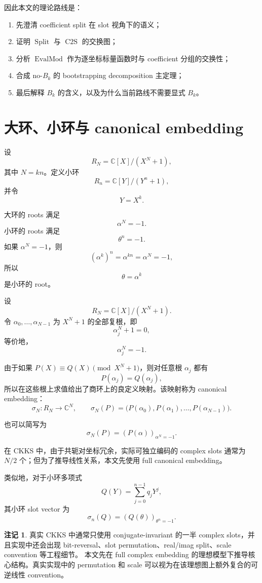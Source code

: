 \documentclass[UTF8,11pt]{ctexart}
\theoremstyle{definition}
\newtheorem{remark}{注记}
\newcommand{\C}{\mathbb{C}}
\newcommand{\CtwoS}{\operatorname{C2S}}
\newcommand{\Split}{\operatorname{Split}}
\newcommand{\EvalMod}{\operatorname{EvalMod}}
\begin{document}
因此本文的理论路线是：
\begin{enumerate}[label=(\roman*)]
    \item 先澄清 coefficient split 在 slot 视角下的语义；
    \item 证明 \(\Split\) 与 \(\CtwoS\) 的交换图；
    \item 分析 \(\EvalMod\) 作为逐坐标标量函数时与 coefficient 分组的交换性；
    \item 合成 no-\(B_k\) 的 bootstrapping decomposition 主定理；
    \item 最后解释 \(B_k\) 的含义，以及为什么当前路线不需要显式 \(B_k\)。
\end{enumerate}

\section{大环、小环与 canonical embedding}

设
\[
R_N=\C[X]/(X^N+1),
\]
其中 \(N=kn\)。定义小环
\[
R_n=\C[Y]/(Y^n+1),
\]
并令
\[
Y=X^k.
\]

大环的 roots 满足
\[
\alpha^N=-1.
\]
小环的 roots 满足
\[
\theta^n=-1.
\]
如果 \(\alpha^N=-1\)，则
\[
(\alpha^k)^n=\alpha^{kn}=\alpha^N=-1,
\]
所以
\[
\theta=\alpha^k
\]
是小环的 root。

设
\[
R_N=\mathbb{C}[X]/(X^N+1).
\]
令 \(\alpha_0,\ldots,\alpha_{N-1}\) 为 \(X^N+1\) 的全部复根，即
\[
\alpha_j^N+1=0,
\]
等价地，
\[
\alpha_j^N=-1.
\]

由于如果 \(P(X)\equiv Q(X)\pmod{X^N+1}\)，则对任意根 \(\alpha_j\) 都有
\[
P(\alpha_j)=Q(\alpha_j),
\]
所以在这些根上求值给出了商环上的良定义映射。该映射称为 canonical embedding：
\[
\sigma_N:R_N\to \mathbb{C}^N,
\qquad
\sigma_N(P)
=
\bigl(P(\alpha_0),P(\alpha_1),\ldots,P(\alpha_{N-1})\bigr).
\]

也可以简写为
\[
\sigma_N(P)=\left(P(\alpha)\right)_{\alpha^N=-1}.
\]

在 CKKS 中，由于共轭对坐标冗余，实际可独立编码的 complex slots 通常为 \(N/2\) 个；但为了推导线性关系，本文先使用 full canonical embedding。

类似地，对于小环多项式
\[
Q(Y)=\sum_{j=0}^{n-1}q_jY^j,
\]
其小环 slot vector 为
\[
\sigma_n(Q)
=
\left(Q(\theta)\right)_{\theta^n=-1}.
\]

\begin{remark}
真实 CKKS 中通常只使用 conjugate-invariant 的一半 complex slots，并且实现中还会出现 bit-reversal、slot permutation、real/imag split、scale convention 等工程细节。
本文先在 full complex embedding 的理想模型下推导核心结构。真实实现中的 permutation 和 scale 可以视为在该理想图上额外复合的可逆线性 convention。
\end{remark}
\end{document}

